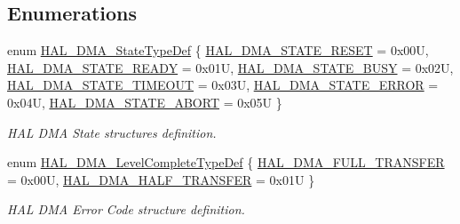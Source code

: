 \subsection*{Enumerations}
\begin{DoxyCompactItemize}
\item 
enum \mbox{\hyperlink{group___d_m_a___exported___types_ga9c012af359987a240826f29073bbe463}{H\+A\+L\+\_\+\+D\+M\+A\+\_\+\+State\+Type\+Def}} \{ \newline
\mbox{\hyperlink{group___d_m_a___exported___types_gga9c012af359987a240826f29073bbe463a9e7be73da32b8c837cde0318e0d5eed2}{H\+A\+L\+\_\+\+D\+M\+A\+\_\+\+S\+T\+A\+T\+E\+\_\+\+R\+E\+S\+ET}} = 0x00U, 
\mbox{\hyperlink{group___d_m_a___exported___types_gga9c012af359987a240826f29073bbe463ad497944e6e72bc3ca904694b1098105a}{H\+A\+L\+\_\+\+D\+M\+A\+\_\+\+S\+T\+A\+T\+E\+\_\+\+R\+E\+A\+DY}} = 0x01U, 
\mbox{\hyperlink{group___d_m_a___exported___types_gga9c012af359987a240826f29073bbe463af7a0a2ca8de4e5be9e85b6a9073476ef}{H\+A\+L\+\_\+\+D\+M\+A\+\_\+\+S\+T\+A\+T\+E\+\_\+\+B\+U\+SY}} = 0x02U, 
\mbox{\hyperlink{group___d_m_a___exported___types_gga9c012af359987a240826f29073bbe463acf3a5443bf4dc71018512a255e2076eb}{H\+A\+L\+\_\+\+D\+M\+A\+\_\+\+S\+T\+A\+T\+E\+\_\+\+T\+I\+M\+E\+O\+UT}} = 0x03U, 
\newline
\mbox{\hyperlink{group___d_m_a___exported___types_gga9c012af359987a240826f29073bbe463ac2ce65c7cb2410c143b14e309ba83742}{H\+A\+L\+\_\+\+D\+M\+A\+\_\+\+S\+T\+A\+T\+E\+\_\+\+E\+R\+R\+OR}} = 0x04U, 
\mbox{\hyperlink{group___d_m_a___exported___types_gga9c012af359987a240826f29073bbe463af199cdb868cfd96fa97decb285643755}{H\+A\+L\+\_\+\+D\+M\+A\+\_\+\+S\+T\+A\+T\+E\+\_\+\+A\+B\+O\+RT}} = 0x05U
 \}
\begin{DoxyCompactList}\small\item\em H\+AL D\+MA State structures definition. \end{DoxyCompactList}\item 
enum \mbox{\hyperlink{group___d_m_a___exported___types_gaee3245eea8fa938edeb35a6c9596fd86}{H\+A\+L\+\_\+\+D\+M\+A\+\_\+\+Level\+Complete\+Type\+Def}} \{ \mbox{\hyperlink{group___d_m_a___exported___types_ggaee3245eea8fa938edeb35a6c9596fd86a5314147c8ba21548763bf89446b78468}{H\+A\+L\+\_\+\+D\+M\+A\+\_\+\+F\+U\+L\+L\+\_\+\+T\+R\+A\+N\+S\+F\+ER}} = 0x00U, 
\mbox{\hyperlink{group___d_m_a___exported___types_ggaee3245eea8fa938edeb35a6c9596fd86ad0ba8bc74a2ae6dcdc3e316e8be0d5d8}{H\+A\+L\+\_\+\+D\+M\+A\+\_\+\+H\+A\+L\+F\+\_\+\+T\+R\+A\+N\+S\+F\+ER}} = 0x01U
 \}
\begin{DoxyCompactList}\small\item\em H\+AL D\+MA Error Code structure definition. \end{DoxyCompactList}\item 

\end{DoxyCompactItemize}
